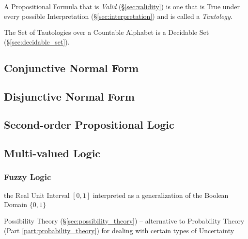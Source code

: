 A Propositional Formula that is \emph{Valid} (\S\ref{sec:validity}) is
one that is True under every possible Interpretation
(\S\ref{sec:interpretation}) and is called a \emph{Tautology}.

The Set of Tautologies over a Countable Alphabet is a Decidable Set
(\S\ref{sec:decidable_set}).



\subsection{Conjunctive Normal Form}\label{sec:conjunctive_form}

\subsection{Disjunctive Normal Form}\label{sec:disjunctive_form}

\subsection{Second-order Propositional Logic}
\label{sec:secondorder_propositional_logic}

\subsection{Multi-valued Logic}\label{sec:multi_valued_logic}

\subsubsection{Fuzzy Logic}\label{sec:fuzzy_logic}

the Real Unit Interval $[0,1]$ interpreted as a generalization of the Boolean
Domain $\{0, 1\}$

Possibility Theory (\S\ref{sec:possibility_theory}) -- alternative to
Probability Theory (Part \ref{part:probability_theory}) for dealing with certain
types of Uncertainty



